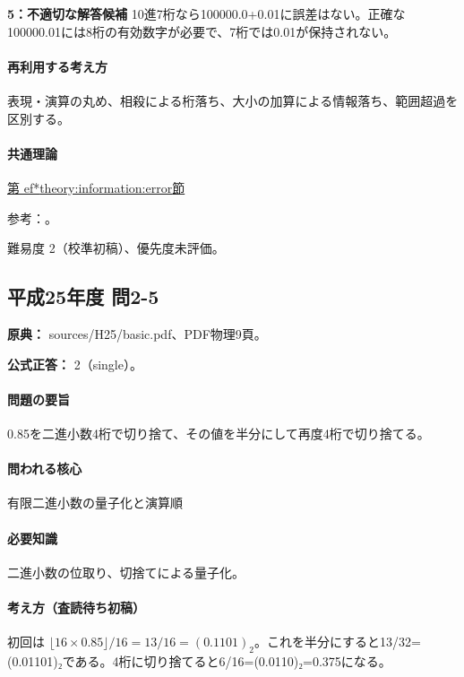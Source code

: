 \noindent\textbf{5：不適切な解答候補} 10進7桁なら100000.0+0.01に誤差はない。正確な100000.01には8桁の有効数字が必要で、7桁では0.01が保持されない。\par

\paragraph{再利用する考え方} 表現・演算の丸め、相殺による桁落ち、大小の加算による情報落ち、範囲超過を区別する。

\paragraph{共通理論} \hyperref[theory:information:error]{第
ef*{theory:information:error}節}

\par 参考：\cite{goldberg1991}。

\par 難易度 2（校準初稿）、優先度未評価。

\subsection{平成25年度 問2-5}
\label{q:h25-reg-basic-2-5}

\noindent\textbf{原典：} sources/H25/basic.pdf、PDF物理9頁。

\textbf{公式正答：} 2（single）。

\paragraph{問題の要旨} 0.85を二進小数4桁で切り捨て、その値を半分にして再度4桁で切り捨てる。

\paragraph{問われる核心} 有限二進小数の量子化と演算順

\paragraph{必要知識} 二進小数の位取り、切捨てによる量子化。

\paragraph{考え方（査読待ち初稿）} 初回は \(\lfloor16\times0.85\rfloor/16=13/16=(0.1101)_2\)。これを半分にすると13/32=(0.01101)₂である。4桁に切り捨てると6/16=(0.0110)₂=0.375になる。

